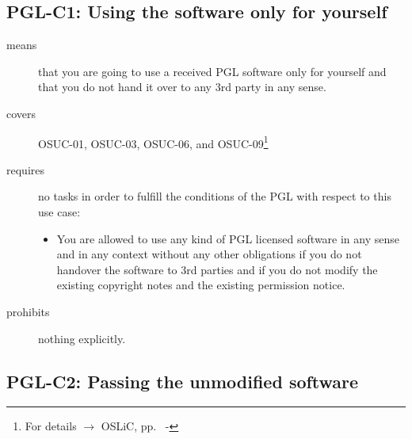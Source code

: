 \begin{center}
\begin{footnotesize}
{{{{{        }
      }
    }
   }   
}
\end{footnotesize}
\end{center}

\subsection{PGL-C1: Using the software only for yourself}
\label{OSUC-01-PGL} 
\label{OSUC-03-PGL} 
\label{OSUC-06-PGL}
\label{OSUC-09-PGL}
  
\begin{description}

\item[means] that you are going to use a received PGL software only for yourself
and that you do not hand it over to any 3rd party in any sense.

\item[covers] OSUC-01, OSUC-03, OSUC-06, and OSUC-09\footnote{For details
$\rightarrow$ OSLiC, pp.\ \pageref{OSUC-01-DEF} - \pageref{OSUC-09-DEF}}

\item[requires] no tasks in order to fulfill the conditions of the PGL with
respect to this use case:
  \begin{itemize}
    \item You are allowed to use any kind of PGL licensed software in any sense
    and in any context without any other obligations if you do not handover the
    software to 3rd parties and if you do not modify the existing copyright
    notes and the existing permission notice.
  \end{itemize}

\item[prohibits] nothing explicitly.

\end{description}

\subsection{PGL-C2: Passing the unmodified software}
\label{OSUC-02S-PGL} \label{OSUC-05S-PGL} \label{OSUC-07S-PGL} 
\label{OSUC-02B-PGL} \label{OSUC-05B-PGL} \label{OSUC-07B-PGL} 

